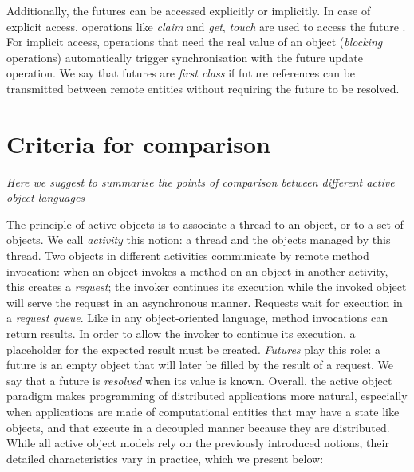 Additionally, the futures can be accessed explicitly or implicitly. In
case of explicit access, operations like \emph{claim} and \emph{get},
\emph{touch} are used to access the future \cite{Elinar2006,ABCL1994}.
For implicit access, operations that need the real value of an object
(\emph{blocking} operations) automatically trigger synchronisation
with the future update operation. We say that futures are \emph{first
	class} if future references can be transmitted between remote
entities without requiring the future to be resolved.



\section{Criteria for comparison}
\emph{Here we suggest to summarise the points of comparison between different active 
object languages}


The principle of active objects is to associate a thread to an object, or to a set of
objects. We call \emph{activity} this notion: a thread and the objects
managed by this thread.  Two objects in different activities 
communicate by remote method invocation: when an object invokes a
method on an object in another activity, this creates a
\emph{request}; the invoker continues its execution while the invoked
object will serve the request in an asynchronous manner. Requests wait for execution in a \emph{request queue}. Like in any
object-oriented language, method invocations can return results. In
order to allow the invoker to continue its execution, a placeholder
for the expected result must be created. \emph{Futures} play this
role: a future is an empty object that will later be filled by the
result of a request. We say that a future is \emph{resolved} when its
value is known.
Overall, the active object paradigm makes programming of distributed
applications more natural, especially when applications are made of
computational entities that may have a state like objects, and that
execute in a decoupled manner because they are distributed.
While all active object models rely on the previously introduced notions, their
detailed characteristics vary in practice, which we present below:

